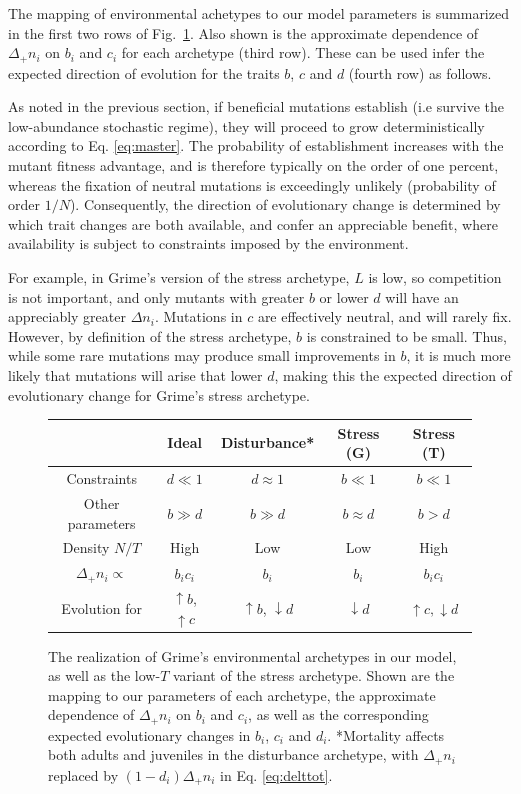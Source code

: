 \documentclass[11pt]{article}
\begin{document}
The mapping of environmental achetypes to our model parameters is summarized in the first two rows of Fig.~\ref{fig:table}. Also shown is the approximate dependence of $\Delta_+ n_i$ on $b_i$ and $c_i$ for each archetype (third row). These can be used infer the expected direction of evolution for the traits $b$, $c$ and $d$ (fourth row) as follows. 

As noted in the previous section, if beneficial mutations establish (i.e survive the low-abundance stochastic regime), they will proceed to grow deterministically according to Eq. \eqref{eq:master}. The probability of establishment increases with the mutant fitness advantage, and is therefore typically on the order of one percent, whereas the fixation of neutral mutations is exceedingly unlikely (probability of order $1/N$). Consequently, the direction of evolutionary change is determined by which trait changes are both available, and confer an appreciable benefit, where availability is subject to constraints imposed by the environment. 

For example, in Grime's version of the stress archetype, $L$ is low, so competition is not important, and only mutants with greater $b$ or lower $d$ will have an appreciably greater $\Delta n_i$. Mutations in $c$ are effectively neutral, and will rarely fix. However, by definition of the stress archetype, $b$ is constrained to be small. Thus, while some rare mutations may produce small improvements in $b$, it is much more likely that mutations will arise that lower $d$, making this the expected direction of evolutionary change for Grime's stress archetype. 

\begin{figure}
\centering
\begin{tabular}{*{5}{c}}
  & Ideal & Disturbance* & Stress (G) & Stress (T) \\ \hline
  Constraints & $d \ll 1$ & $d \approx 1$ & $b \ll 1$ & $b \ll 1$ \\
  Other parameters & $b\gg d$ & $b\gg d$ & $b\approx d$ & $b>d$ \\
  Density $N/T$  & High & Low & Low & High \\
  $\Delta_+ n_i\propto$ & $b_i c_i$ & $b_i$ & $b_i$ & $b_i c_i$ \\
  Evolution for & $\uparrow b$, $ \uparrow c$ & $\uparrow b$, $\downarrow d$ & $\downarrow d$ & $\uparrow c, \downarrow d$
\end{tabular}
\caption{\label{fig:table} The realization of Grime's environmental archetypes in our model, as well as the low-$T$ variant of the stress archetype. Shown are the mapping to our parameters of each archetype, the approximate dependence of $\Delta_+ n_i$ on $b_i$ and $c_i$, as well as the corresponding expected evolutionary changes in $b_i$, $c_i$ and $d_i$. *Mortality affects both adults and juveniles in the disturbance archetype, with $\Delta_+ n_i$ replaced by $(1-d_i)\Delta_+ n_i$ in Eq. \eqref{eq:delttot}.}
\end{figure}
\end{document}
